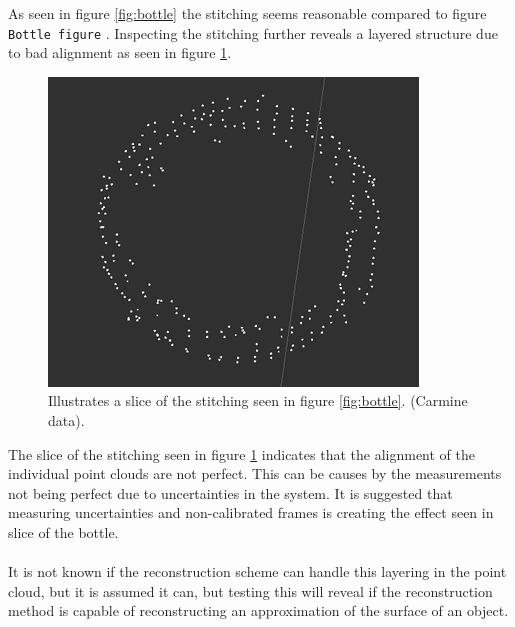 \noindent As seen in figure \ref{fig:bottle} the stitching seems reasonable compared to figure \texttt{Bottle figure} . Inspecting the stitching further reveals a layered structure due to bad alignment as seen in figure \ref{fig:bottle_slice}.

\begin{figure}[htb]
	\begin{center}
		\includegraphics[scale=0.7,trim=0 0 0 0]{graphics/07_modelling/slice.png}%
		\caption{Illustrates a slice of the stitching seen in figure \ref{fig:bottle}. (Carmine data).}
		\label{fig:bottle_slice}
	\end{center}
\end{figure}

\noindent The slice of the stitching seen in figure \ref{fig:bottle_slice} indicates that the alignment of the individual point clouds are not perfect. This can be causes by the measurements not being perfect due to uncertainties in the system. It is suggested that measuring uncertainties and non-calibrated frames is creating the effect seen in slice of the bottle.\\
\\
It is not known if the reconstruction scheme can handle this layering in the point cloud, but it is assumed it can, but testing this will reveal if the reconstruction method is capable of reconstructing an approximation of the surface of an object.